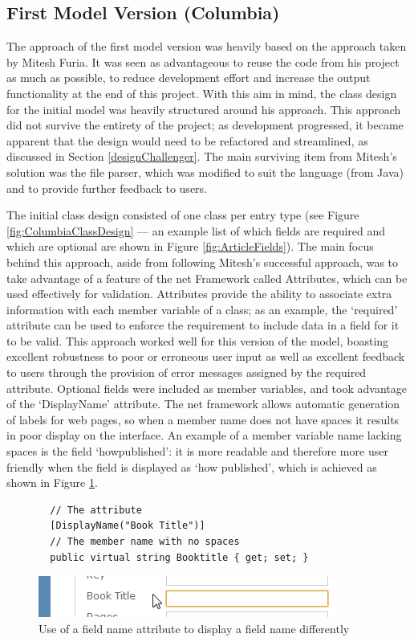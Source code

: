 \subsection{First Model Version (Columbia)}
\label{columbia}
The approach of the first model version was heavily based on the approach taken by Mitesh Furia. It was seen as advantageous to reuse the code from his project as much as possible, to reduce development effort and increase the output functionality at the end of this project.  With this aim in mind, the class design for the initial model was heavily structured around his approach.  This approach did not survive the entirety of the project; as development progressed, it became apparent that the design would need to be refactored and streamlined, as discussed in Section \ref{designChallenger}.  The main surviving item from Mitesh's solution was the file parser, which was modified to suit the \cs{} language (from Java) and to provide further feedback to users.

The initial class design consisted of one class per entry type (see Figure \ref{fig:ColumbiaClassDesign} --- an example list of which fields are required and which are optional are shown in Figure \ref{fig:ArticleFields}).  The main focus behind this approach, aside from following Mitesh's successful approach, was to take advantage of a feature of the \gls{net} Framework called Attributes, which can be used effectively for validation.  Attributes provide the ability to associate extra information with each member variable of a class; as an example, the `required' attribute can be used to enforce the requirement to include data in a field for it to be valid.  This approach worked well for this version of the model, boasting excellent robustness to poor or erroneous user input as well as excellent feedback to users through the provision of error messages assigned by the required attribute.  Optional fields were included as member variables, and took advantage of the `DisplayName' attribute. The \gls{net} framework allows automatic generation of labels for web pages, so when a member name does not have spaces it results in poor display on the interface.  An example of a member variable name lacking spaces is the field `howpublished': it is more readable and therefore more user friendly when the field is displayed as `how published', which is achieved as shown in Figure \ref{fig:displayName}.

\begin{figure}
	\begin{center}
			\lstset{language=CSharp} 
			\begin{lstlisting}
  // The attribute
  [DisplayName("Book Title")]
  // The member name with no spaces
  public virtual string Booktitle { get; set; }
			\end{lstlisting}
		\includegraphics{images/displayNameOnInterface.png}
		\caption{Use of a field name attribute to display a field name differently}
		\label{fig:displayName}
	\end{center}
\end{figure}

